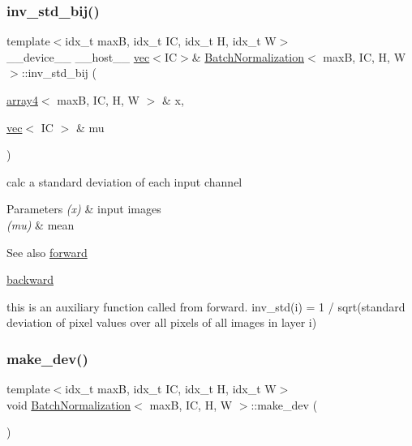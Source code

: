 \subsubsection{\texorpdfstring{inv\+\_\+std\+\_\+bij()}{inv\_std\_bij()}}
{\footnotesize\ttfamily template$<$idx\+\_\+t maxB, idx\+\_\+t IC, idx\+\_\+t H, idx\+\_\+t W$>$ \\
\+\_\+\+\_\+device\+\_\+\+\_\+ \+\_\+\+\_\+host\+\_\+\+\_\+ \hyperlink{structvec}{vec}$<$IC$>$\& \hyperlink{structBatchNormalization}{Batch\+Normalization}$<$ maxB, IC, H, W $>$\+::inv\+\_\+std\+\_\+bij (\begin{DoxyParamCaption}\item[{\hyperlink{structarray4}{array4}$<$ maxB, IC, H, W $>$ \&}]{x,  }\item[{\hyperlink{structvec}{vec}$<$ IC $>$ \&}]{mu }\end{DoxyParamCaption})\hspace{0.3cm}{\ttfamily [inline]}}



calc a standard deviation of each input channel 


\begin{DoxyParams}{Parameters}
{\em (x)} & input images \\
\hline
{\em (mu)} & mean \\
\hline
\end{DoxyParams}
\begin{DoxySeeAlso}{See also}
\hyperlink{structBatchNormalization_a315cda9d48dfa18a2f4f65ac7bb3b891}{forward} 

\hyperlink{structBatchNormalization_a3b6d987026effdc6c3a2c99e54ae58f9}{backward}
\end{DoxySeeAlso}
this is an auxiliary function called from forward. inv\+\_\+std(i) = 1 / sqrt(standard deviation of pixel values over all pixels of all images in layer i) \mbox{\label{structBatchNormalization_a0d925e23b6e4d49e64319dd02d93b480}} 
\subsubsection{\texorpdfstring{make\+\_\+dev()}{make\_dev()}}
{\footnotesize\ttfamily template$<$idx\+\_\+t maxB, idx\+\_\+t IC, idx\+\_\+t H, idx\+\_\+t W$>$ \\
void \hyperlink{structBatchNormalization}{Batch\+Normalization}$<$ maxB, IC, H, W $>$\+::make\+\_\+dev (\begin{DoxyParamCaption}{ }\end{DoxyParamCaption})\hspace{0.3cm}{\ttfamily [inline]}}



